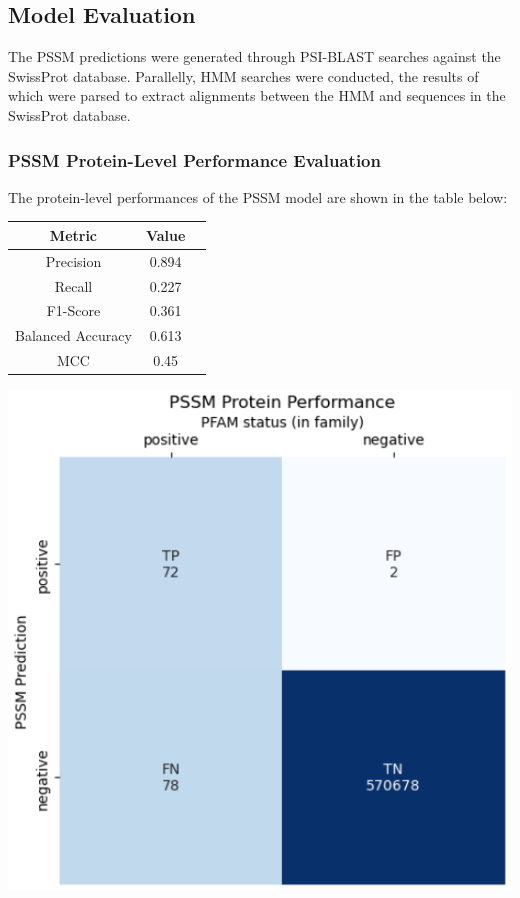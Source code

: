 \documentclass[10pt,twocolumn,letterpaper]{article}
\begin{document}
\subsection{Model Evaluation}

The PSSM predictions were generated through PSI-BLAST searches against the SwissProt database.
Parallelly, HMM searches were conducted, the results of which were parsed to extract alignments between the HMM and sequences in the SwissProt database.

\subsubsection{PSSM Protein-Level Performance Evaluation}

The protein-level performances of the PSSM model are shown in the table below:

\begin{center}
    \begin{tabular}{ccc}
        \toprule
        Metric & Value \\
        \midrule
        Precision & 0.894 \\
        Recall & 0.227 \\
        F1-Score & 0.361 \\
        Balanced Accuracy & 0.613 \\
        MCC & 0.45 \\
        \bottomrule
    \end{tabular}
\end{center} 

\begin{center}
    \includegraphics[scale=0.45]{report/img/pssm_prot_performance.png}
\end{center}
\end{document}
